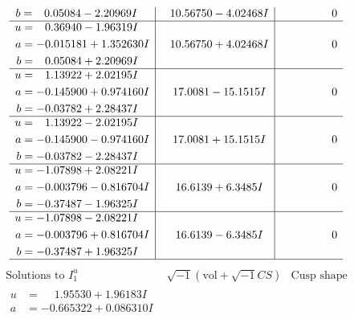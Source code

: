 \documentclass[1p]{elsarticle_modified}
\theoremstyle{definition}
\newcommand{\I}{\sqrt{-1}}
\begin{document}
$$\begin{array}{c|c|c}
\begin{aligned}
b &= \phantom{-}0.05084 - 2.20969 I\end{aligned}
 & \phantom{-}10.56750 - 4.02468 I & \phantom{-0.000000 } 0 \\ \hline\begin{aligned}
u &= \phantom{-}0.36940 - 1.96319 I \\
a &= -0.015181 + 1.352630 I \\
b &= \phantom{-}0.05084 + 2.20969 I\end{aligned}
 & \phantom{-}10.56750 + 4.02468 I & \phantom{-0.000000 } 0 \\ \hline\begin{aligned}
u &= \phantom{-}1.13922 + 2.02195 I \\
a &= -0.145900 + 0.974160 I \\
b &= -0.03782 + 2.28437 I\end{aligned}
 & \phantom{-}17.0081 - 15.1515 I & \phantom{-0.000000 } 0 \\ \hline\begin{aligned}
u &= \phantom{-}1.13922 - 2.02195 I \\
a &= -0.145900 - 0.974160 I \\
b &= -0.03782 - 2.28437 I\end{aligned}
 & \phantom{-}17.0081 + 15.1515 I & \phantom{-0.000000 } 0 \\ \hline\begin{aligned}
u &= -1.07898 + 2.08221 I \\
a &= -0.003796 - 0.816704 I \\
b &= -0.37487 - 1.96325 I\end{aligned}
 & \phantom{-}16.6139 + 6.3485 I & \phantom{-0.000000 } 0 \\ \hline\begin{aligned}
u &= -1.07898 - 2.08221 I \\
a &= -0.003796 + 0.816704 I \\
b &= -0.37487 + 1.96325 I\end{aligned}
 & \phantom{-}16.6139 - 6.3485 I & \phantom{-0.000000 } 0\\
 \hline 
 \end{array}$$\newpage$$\begin{array}{c|c|c}  
\text{Solutions to }I^u_{1}& \I (\text{vol} + \sqrt{-1}CS) & \text{Cusp shape}\\
 \hline 
\begin{aligned}
u &= \phantom{-}1.95530 + 1.96183 I \\
a &= -0.665322 + 0.086310 I \\

\end{aligned}
\end{array}$$
\end{document}
